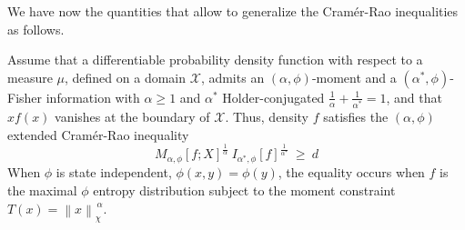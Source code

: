\documentclass[entropy,article,submit,moreauthors,pdftex]{Definitions/mdpi}
\def\X{\mathcal{X}}
\begin{document}
We  have  now   the  quantities  that  allow  to   generalize  the  Cram\'er-Rao
inequalities as follows.
%
\begin{Proposition}
\label{prop:np-phi-CR}
%
  Assume that  a differentiable probability  density function with respect  to a
  measure $\mu$, defined on a  domain $\X$, admits an $(\alpha,\phi)$-moment and
  a  $(\alpha^*,\phi)$-Fisher information  with  $\alpha \ge  1$ and  $\alpha^*$
  Holder-conjugated  $\frac{1}{\alpha} +  \frac{1}{\alpha^*} =  1$, and  that $x
  f(x)$  vanishes at  the boundary  of $\X$.   Thus, density  $f$ satisfies  the
  $(\alpha,\phi)$ extended Cram\'er-Rao inequality
  \begin{equation}\label{eq:np-phi-CR}
   M_{\alpha,\phi}[f;X]^{\frac{1}{\alpha}} \: I_{\alpha^*\!,\phi}[f]^{\frac{1}{\alpha^*}}
   \: \ge \: d
  \end{equation}
  When $\phi$ is  state independent, $\phi(x,y) = \phi(y)$,  the equality occurs
  when $f$  is the  maximal $\phi$  entropy distribution  subject to  the moment
  constraint $T(x) = \left\| x \right\|_{\chi}^{\, \alpha}$.
\end{Proposition}
\end{document}
